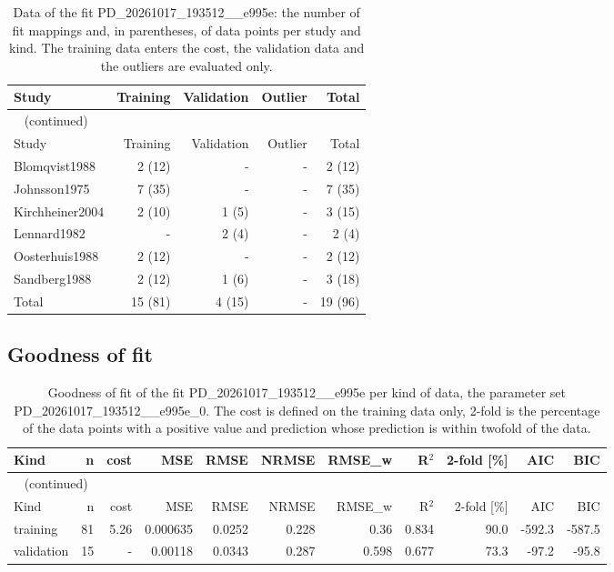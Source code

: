 \documentclass{article}
\begin{document}
\begin{longtable}{lrrrr}
\caption{Data of the fit PD\_20261017\_193512\_\_e995e: the number of fit mappings and, in parentheses, of data points per study and kind. The training data enters the cost, the validation data and the outliers are evaluated only.}\label{tab:data:PD_20261017_193512__e995e} \\
\toprule
Study & Training & Validation & Outlier & Total \\
\midrule
\endfirsthead
\multicolumn{5}{l}{\small\tablename~\thetable{} (continued)} \\
\toprule
Study & Training & Validation & Outlier & Total \\
\midrule
\endhead
\bottomrule
\endlastfoot
Blomqvist1988 & 2 (12) & - & - & 2 (12) \\
Johnsson1975 & 7 (35) & - & - & 7 (35) \\
Kirchheiner2004 & 2 (10) & 1 (5) & - & 3 (15) \\
Lennard1982 & - & 2 (4) & - & 2 (4) \\
Oosterhuis1988 & 2 (12) & - & - & 2 (12) \\
Sandberg1988 & 2 (12) & 1 (6) & - & 3 (18) \\
Total & 15 (81) & 4 (15) & - & 19 (96) \\
\end{longtable}

\subsection{Goodness of fit}

\begin{longtable}{lrrrrrrrrrr}
\caption{Goodness of fit of the fit PD\_20261017\_193512\_\_e995e per kind of data, the parameter set PD\_20261017\_193512\_\_e995e\_0. The cost is defined on the training data only, 2-fold is the percentage of the data points with a positive value and prediction whose prediction is within twofold of the data.}\label{tab:metrics:PD_20261017_193512__e995e} \\
\toprule
Kind & n & cost & MSE & RMSE & NRMSE & RMSE\_w & R\ensuremath{^{2}} & 2-fold [\%] & AIC & BIC \\
\midrule
\endfirsthead
\multicolumn{11}{l}{\small\tablename~\thetable{} (continued)} \\
\toprule
Kind & n & cost & MSE & RMSE & NRMSE & RMSE\_w & R\ensuremath{^{2}} & 2-fold [\%] & AIC & BIC \\
\midrule
\endhead
\bottomrule
\endlastfoot
training & 81 & 5.26 & 0.000635 & 0.0252 & 0.228 & 0.36 & 0.834 & 90.0 & -592.3 & -587.5 \\
validation & 15 & - & 0.00118 & 0.0343 & 0.287 & 0.598 & 0.677 & 73.3 & -97.2 & -95.8 \\
\end{longtable}
\end{document}
